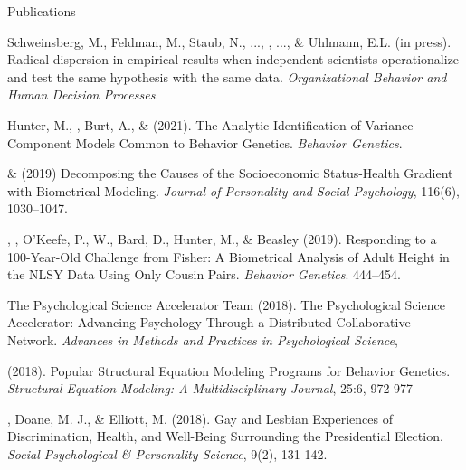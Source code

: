 \begin{rSection}{\textrm{Publications}}%
\begin{etaremune}
\item Schweinsberg, M., Feldman, M., Staub, N., ..., \meb, ..., \& Uhlmann, E.L. (in press). Radical dispersion in empirical results when independent scientists operationalize and test the same hypothesis with the same data. \textit{Organizational Behavior and Human Decision Processes}. 
%
\item Hunter, M., \meb, Burt, A., \& \joe (2021). The Analytic Identification of Variance Component Models Common to Behavior Genetics. \textit{Behavior Genetics}. 
%
\item \meb \& \joe (2019) Decomposing the Causes of the Socioeconomic Status-Health Gradient with Biometrical Modeling. \textit{Journal of Personality and Social Psychology}, 116(6), 1030–1047.  %
%
\item\Joe, \meb, O'Keefe, P., W., Bard, D., Hunter, M., \& Beasley (2019). Responding to a 100-Year-Old Challenge from Fisher: A Biometrical Analysis of Adult Height in the NLSY Data Using Only Cousin Pairs. \textit{Behavior Genetics}. 444–454. 
%
\item The Psychological Science Accelerator Team (2018). The Psychological Science Accelerator: Advancing Psychology Through a Distributed Collaborative Network. \textit{Advances in Methods and Practices in Psychological Science}, 
%
\item \meb (2018). Popular Structural Equation Modeling Programs for Behavior Genetics. \textit{Structural Equation Modeling: A Multidisciplinary Journal}, 25:6, 972-977 
%
\item\meb, Doane, M. J., \& Elliott, M. (2018). Gay and Lesbian Experiences of Discrimination, Health, and Well-Being Surrounding the Presidential Election. \textit{Social Psychological \& Personality Science}, 9(2), 131-142. 

\end{etaremune}
\end{rSection}
